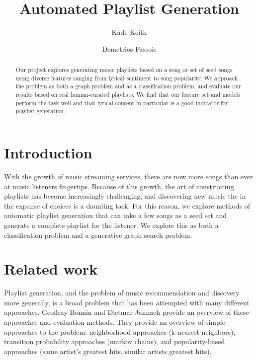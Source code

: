 \documentclass[acmtog]{acmart}
\begin{document}
\title{Automated Playlist Generation}

\author{Kade Keith}
\author{Demetrios Fassois}

\begin{abstract}
Our project explores generating music playlists based on a song or set of seed songs using diverse features ranging from lyrical sentiment to song popularity. We approach the problem as both a graph problem and as a classification problem, and evaluate our results based on real human-curated playlists. We find that our feature set and models perform the task well and that lyrical content in particular is a good indicator for playlist generation.
\end{abstract}

\maketitle
\thispagestyle{empty}

\section{Introduction}

With the growth of music streaming services, there are now more songs than ever at music listeners fingertips. Because of this growth, the art of constructing playlists has become increasingly challenging, and discovering new music the in the expanse of choices is a daunting task. For this reason, we explore methods of automatic playlist generation that can take a few songs as a seed set and generate a complete playlist for the listener. We explore this as both a classification problem and a generative graph search problem.

\section{Related work}

Playlist generation, and the problem of music recommendation and discovery more generally, is a broad problem that has been attempted with many different approaches. Geoffray Bonnin and Dietmar Jannach \cite{Bonnin2013ACO} provide an overview of these approaches and evaluation methods. They provide an overview of simple approaches to the problem: neighborhood approaches (k-nearest-neighbors), transition probability approaches (markov chains), and popularity-based approaches (same artist's greatest hits, similar artists greatest hits).
\end{document}
